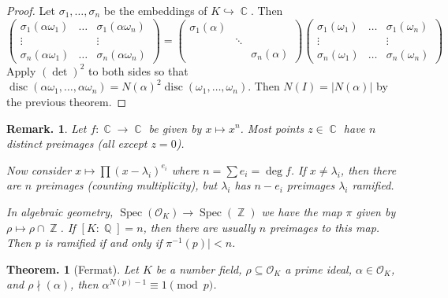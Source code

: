 \documentclass[11pt, a4paper]{memoir}
\DeclareMathOperator{\Q}{{\mathbb{Q}}}
\DeclareMathOperator{\Z}{{\mathbb{Z}}}
\DeclareMathOperator{\C}{{\mathbb{C}}}
\newcommand{\hto}[0]{\ensuremath{\hookrightarrow}}
\theoremstyle{change}
\newtheorem{theorem}{Theorem.}[section]
\theoremstyle{plain}
\theoremstyle{nonumberplain}
\newtheorem{remark}{Remark.}
\newtheorem{proof}{Proof}
\DeclareMathOperator{\disc}{disc}
\DeclareMathOperator{\Spec}{Spec}
\numberwithin{equation}{section}
\begin{document}
\begin{proof}
    Let $\sigma_1,\ldots,\sigma_n$ be the embeddings of $K\hto\C$.
    Then
    \begin{equation*}
        \begin{pmatrix}
            \sigma_1(\alpha\omega_1) &\hdots&\sigma_1(\alpha\omega_n)\\
            \vdots&&\vdots\\
            \sigma_n(\alpha\omega_1) &\hdots&\sigma_n(\alpha\omega_n)
        \end{pmatrix}
    =
        \begin{pmatrix}
            \sigma_1(\alpha) &&\\
                             &\ddots&\\
                             &&\sigma_n(\alpha)
        \end{pmatrix}
        \begin{pmatrix}
            \sigma_1(\omega_1) &\hdots&\sigma_1(\omega_n)\\
            \vdots&&\vdots\\
            \sigma_n(\omega_1) &\hdots&\sigma_n(\omega_n)
        \end{pmatrix}
    \end{equation*}
    Apply $(\det)^2$ to both sides so that $\disc(\alpha\omega_1,\ldots,\alpha\omega_n)=N(\alpha)^2\disc(\omega_1,\ldots,\omega_n)$.
    Then $N(I)=|N(\alpha)|$ by the previous theorem.
\end{proof}
\begin{remark}
    Let $f:\C\to\C$ be given by $x\mapsto x^n$.
    Most points $z\in\C$ have $n$ distinct preimages (all except $z=0$).

    Now consider $x\mapsto\prod(x-\lambda_i)^{e_i}$ where $n=\sum e_i=\deg f$.
    If $x\neq\lambda_i$, then there are $n$ preimages (counting multiplicity), but $\lambda_i$ has $n-e_i$ preimages $\lambda_i$ ramified.

    In algebraic geometry, $\Spec(\mathcal{O}_K)\to\Spec(\Z)$ we have the map $\pi$ given by $\rho\mapsto\rho\cap\Z$.
    If $[K:\Q]=n$, then there are usually $n$ preimages to this map.
    Then $p$ is ramified if and only if $\pi^{-1}(p)|<n$.
\end{remark}
\begin{theorem}[Fermat]
    Let $K$ be a number field, $\rho\subseteq\mathcal{O}_K$ a prime ideal, $\alpha\in\mathcal{O}_K$, and $\rho\nmid(\alpha)$, then $\alpha^{N(p)-1}\equiv 1\pmod{p}$.
\end{theorem}
\end{document}
